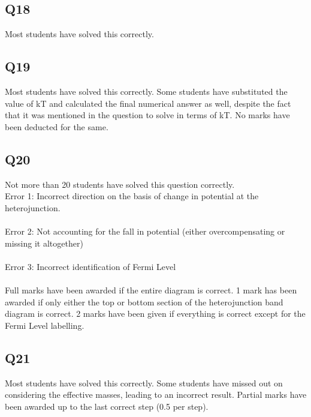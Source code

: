 \documentclass[12pt]{article}\date{}
\begin{document}
\subsection{Q18}
\noindent Most students have solved this correctly.
\subsection{Q19}
\noindent Most students have solved this correctly. Some students have substituted the value of kT and calculated the final numerical answer as well, despite the fact that it was mentioned in the question to solve in terms of kT. No marks have been deducted for the same.
\subsection{Q20}
\noindent Not more than 20 students have solved this question correctly. \\
Error 1: Incorrect direction on the basis of change in potential at the heterojunction. \\ \\
Error 2: Not accounting for the fall in potential (either overcompensating or missing it altogether) \\ \\
Error 3: Incorrect identification of Fermi Level \\ \\
Full marks have been awarded if the entire diagram is correct. 1 mark has been awarded if only either the top or bottom section of the heterojunction band diagram is correct. 2 marks have been given if everything is correct except for the Fermi Level labelling.
\subsection{Q21}
\noindent Most students have solved this correctly. Some students have missed out on considering the effective masses, leading to an incorrect result. Partial marks have been awarded up to the last correct step (0.5 per step). 
\end{document}
